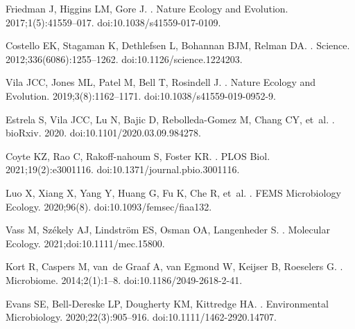 \documentclass[10pt,letterpaper]{article}
\begin{document}
\begin{thebibliography}{10}
Friedman J, Higgins LM, Gore J.
.
\newblock Nature Ecology and Evolution. 2017;1(5):41559--017.
\newblock doi:{10.1038/s41559-017-0109}.

Costello EK, Stagaman K, Dethlefsen L, Bohannan BJM, Relman DA.
.
\newblock Science. 2012;336(6086):1255--1262.
\newblock doi:{10.1126/science.1224203}.

Vila JCC, Jones ML, Patel M, Bell T, Rosindell J.
.
\newblock Nature Ecology and Evolution. 2019;3(8):1162--1171.
\newblock doi:{10.1038/s41559-019-0952-9}.

Estrela S, Vila JCC, Lu N, Bajic D, Rebolleda-Gomez M, Chang CY, et~al.
.
\newblock bioRxiv. 2020.
\newblock doi:{10.1101/2020.03.09.984278}.

Coyte KZ, Rao C, Rakoff-nahoum S, Foster KR.
.
\newblock PLOS Biol. 2021;19(2):e3001116.
\newblock doi:{10.1371/journal.pbio.3001116}.

Luo X, Xiang X, Yang Y, Huang G, Fu K, Che R, et~al.
.
\newblock FEMS Microbiology Ecology. 2020;96(8).
\newblock doi:{10.1093/femsec/fiaa132}.

Vass M, Sz{\'{e}}kely AJ, Lindstr{\"{o}}m ES, Osman OA, Langenheder S.
.
\newblock Molecular Ecology. 2021;doi:{10.1111/mec.15800}.

Kort R, Caspers M, van~de Graaf A, van Egmond W, Keijser B, Roeselers G.
.
\newblock Microbiome. 2014;2(1):1--8.
\newblock doi:{10.1186/2049-2618-2-41}.

Evans SE, Bell-Dereske LP, Dougherty KM, Kittredge HA.
.
\newblock Environmental Microbiology. 2020;22(3):905--916.
\newblock doi:{10.1111/1462-2920.14707}.


\end{thebibliography}
\end{document}

